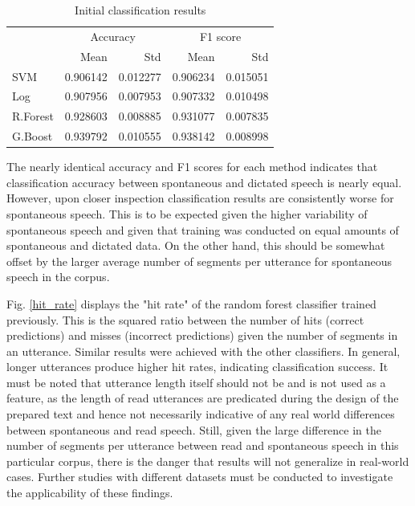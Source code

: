 \documentclass[conference]{IEEEtran}
\begin{document}
\begin{table}[!htb]
\renewcommand{\arraystretch}{1.3}
    \caption{Initial classification results}
\label{init_results}
\centering
\begin{tabular}{l|rr|rr}
    {} & \multicolumn{2}{|c|}{Accuracy} &
    \multicolumn{2}{|c}{F1 score} \\
    {} & Mean & Std & Mean & Std \\
    \hline
    SVM &  0.906142 &  0.012277 &  0.906234 &  0.015051 \\
    Log &  0.907956 &  0.007953 &  0.907332 &  0.010498 \\
    R.Forest &  0.928603 &  0.008885 &  0.931077 &  0.007835 \\
    G.Boost &  0.939792 &  0.010555 &  0.938142 &  0.008998 \\
\end{tabular}
\end{table}

The nearly identical accuracy and F1 scores for each method indicates that classification accuracy between spontaneous and dictated speech is nearly equal.
However, upon closer inspection classification results are consistently worse for spontaneous speech.
This is to be expected given the higher variability of spontaneous speech and given that training was conducted on equal amounts of spontaneous and dictated data.
On the other hand, this should be somewhat offset by the larger average number of segments per utterance for spontaneous speech in the corpus.

Fig. \ref{hit_rate} displays the "hit rate" of the random forest classifier trained previously.
This is the squared ratio between the number of hits (correct predictions) and misses (incorrect predictions) given the number of segments in an utterance.
Similar results were achieved with the other classifiers.
In general, longer utterances produce higher hit rates, indicating classification success.
It must be noted that utterance length itself should not be and is not used as a feature, as the length of read utterances are predicated during the design of the prepared text and hence not necessarily indicative of any real world differences between spontaneous and read speech.
Still, given the large difference in the number of segments per utterance between read and spontaneous speech in this particular corpus, there is the danger that results will not generalize in real-world cases.
Further studies with different datasets must be conducted to investigate the applicability of these findings.
\end{document}
